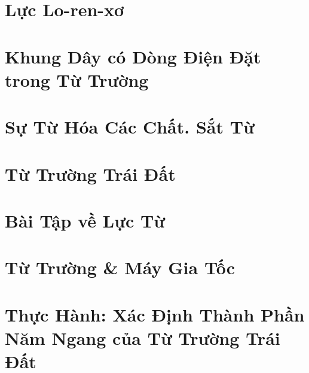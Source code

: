 \documentclass[oneside]{book}
\numberwithin{equation}{section}
\begin{document}

\section{Lực Lo-ren-xơ}


\section{Khung Dây có Dòng Điện Đặt trong Từ Trường}


\section{Sự Từ Hóa Các Chất. Sắt Từ}


\section{Từ Trường Trái Đất}


\section{Bài Tập về Lực Từ}


\section{Từ Trường \& Máy Gia Tốc}


\section{Thực Hành: Xác Định Thành Phần Năm Ngang của Từ Trường Trái Đất}

\end{document}
